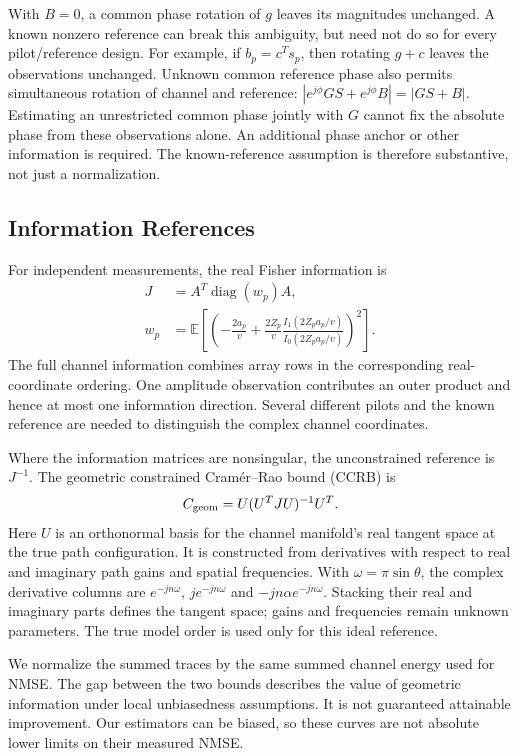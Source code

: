 \documentclass[10pt,journal,letterpaper]{IEEEtran}
\DeclareMathOperator{\diag}{diag}
\begin{document}
With $B=0$, a common phase rotation of $g$ leaves its magnitudes unchanged. A known nonzero reference can break this ambiguity, but need not do so for every pilot/reference design. For example, if $b_p=c^Ts_p$, then rotating $g+c$ leaves the observations unchanged. Unknown common reference phase also permits simultaneous rotation of channel and reference: $|e^{j\phi}GS+e^{j\phi}B|=|GS+B|$. Estimating an unrestricted common phase jointly with $G$ cannot fix the absolute phase from these observations alone. An additional phase anchor or other information is required. The known-reference assumption is therefore substantive, not just a normalization.

\subsection{Information References}
For independent measurements, the real Fisher information is
\begin{align}
 J&=A^T\diag(w_p)A,\nonumber\\
 w_p&=\mathbb E\!\left[\left(-\frac{2a_p}{v}+\frac{2Z_p}{v}
 \frac{I_1(2Z_pa_p/v)}{I_0(2Z_pa_p/v)}\right)^2\right].
 \label{eq:fisher}
\end{align}
The full channel information combines array rows in the corresponding real-coordinate ordering. One amplitude observation contributes an outer product and hence at most one information direction. Several different pilots and the known reference are needed to distinguish the complex channel coordinates.

Where the information matrices are nonsingular, the unconstrained reference is $J^{-1}$. The geometric constrained Cram\'er--Rao bound (CCRB) is~\cite{stoica1998}
\begin{equation}
 C_{\rm geom}=U(U^TJU)^{-1}U^T.
 \label{eq:ccrb}
\end{equation}
Here $U$ is an orthonormal basis for the channel manifold's real tangent space at the true path configuration. It is constructed from derivatives with respect to real and imaginary path gains and spatial frequencies. With $\omega=\pi\sin\theta$, the complex derivative columns are $e^{-jn\omega}$, $je^{-jn\omega}$ and $-jn\alpha e^{-jn\omega}$. Stacking their real and imaginary parts defines the tangent space; gains and frequencies remain unknown parameters. The true model order is used only for this ideal reference.

We normalize the summed traces by the same summed channel energy used for NMSE. The gap between the two bounds describes the value of geometric information under local unbiasedness assumptions. It is not guaranteed attainable improvement. Our estimators can be biased, so these curves are not absolute lower limits on their measured NMSE.
\end{document}
